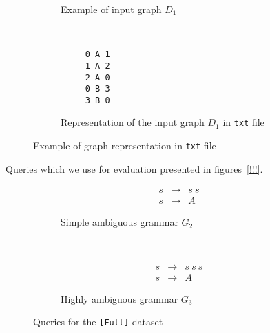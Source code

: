 \begin{figure}[h]
    \centering
    \begin{subfigure}[b]{0.24\textwidth}
        \centering

        \caption{Example of input graph $D_1$}
    \end{subfigure}%
    ~
    \begin{subfigure}[b]{0.24\textwidth}
        \centering
         \begin{verbatim}
     0 A 1
     1 A 2
     2 A 0
     0 B 3
     3 B 0
 \end{verbatim}

        \caption{Representation of the input graph $D_1$ in \texttt{txt} file}
    \end{subfigure}
    \caption{Example of graph representation in \texttt{txt} file}
    \label{fig:graph_example}
\end{figure}

Queries which we use for evaluation presented in figures~\ref{!!!}.


\begin{figure}[h]
    \centering
    \begin{subfigure}[b]{0.24\textwidth}
        \centering
        \[
         \begin{array}{rcl}
           s & \rightarrow & s \ s \\
           s & \rightarrow & A
         \end{array}
         \]
        \caption{Simple ambiguous grammar $G_2$}
    \end{subfigure}%
    ~
    \begin{subfigure}[b]{0.24\textwidth}
        \centering
        \[
         \begin{array}{rcl}
           s & \rightarrow & s \ s \ s \\
           s & \rightarrow & A
         \end{array}
         \]
        \caption{Highly ambiguous grammar $G_3$}
    \end{subfigure}
    \caption{Queries for the \texttt{[Full]} dataset}
    \label{fig:grammar_full}
\end{figure}

